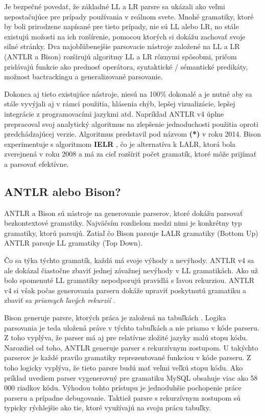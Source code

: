Je bezpečné povedať, že základné LL a LR parsre sa ukázali ako veľmi nepostačujúce pre prípady používania v reálnom svete. Mnohé gramatiky, ktoré by boli prirodzene napísané pre tieto prípady, nie sú LL alebo LR, no stále existujú možosti na ich rozšírenie, pomocou ktorých si dokážu zachovať svoje silné stránky. Dva najobľúbenejšie parsovacie nástroje založené na LL a LR (ANTLR a Bison) rozširujú algoritmy LL a LR rôznymi spôsobmi, pričom pridávajú funkcie ako prednosť operátora, syntaktické / sémantické predikáty, možnost bactrackingu a generalizované parsovanie.

Dokonca aj tieto existujúce nástroje, niesú na 100\% dokonalé a je nutné aby sa stále vyvýjali aj v rámci použitia, hlásenia chýb, lepšej vizualizácie, lepšej integrácie z programovacími jazykmi atd. Napríklad ANTLR v4 úplne prepracoval svoj analytický algoritmus na zlepšenie jednoduchosti použitia oproti predchádzajúcej verzie. Algoritmus predstavil pod názvom \textbf{(*)}\cite{ALL} v roku 2014. Bison experimentuje s algoritmom \textbf{IELR} \cite{IELR}, čo je alternatíva k LALR, ktorá bola zverejnená v roku 2008 a má za cieľ rozšíriť počet gramatík, ktoré môže prijímať a parsovať efektívne.

\subsection{ANTLR alebo Bison?}
ANTLR a Bison sú nástroje na generovanie parserov, ktoré dokážu parsovať bezkontextové gramatiky. Najväčsím rozdielom medzi nimi je konkrétny typ gramatiky, ktorú parsujú. Zatiaľ čo Bison parsuje LALR gramatiky (Bottom Up) ANTLR parsuje LL gramatiky (Top Down). 

Čo sa týka týchto gramatík, každá má svoje výhody a nevýhody. ANTLR v4 sa ale dokázal čiastočne zbaviť jednej závažnej nevýhody v LL gramatikách. Ako už bolo spomenuté LL gramatiky nepodporujú pravidlá s ľavou rekurziou. ANTLR v4 si však počas generovania parseru dokáže upraviť poskytnutú gramatiku a zbaviť sa \textit{priamych ľavých rekurzií} \cite{ALL}.

Bison generuje parsre, ktorých práca je založená na tabuľkách \cite{IELR}. Logika parsovania je teda uložená práve v týchto tabuľkách a nie priamo v kóde parseru. Z toho vyplýva, že parser má aj pre relatívne zložité jazyky malú stopu kódu. Narozdiel od toho, ANTLR generuje parser s rekurzívnym zostupom. U takýchto parserov je každé pravilo gramatiky reprezentované funkciou v kóde parseru. Z toho logicky vyplýva, že tieto parsre budú mať veľmi veľkú stopu kódu. Ako príklad uvediem parser vygenerovný pre gramatiku MySQL obsahuje viac ako 58 000 riadkov kódu. Výhodou tohto prístupu je jednoduhšie pochopenie práce parseru a prípadne debugovanie. Taktiež parsre s rekurzívnym zostupom sú typicky rýchlejšie ako tie, ktoré využívajú na svoju prácu tabuľky. 

